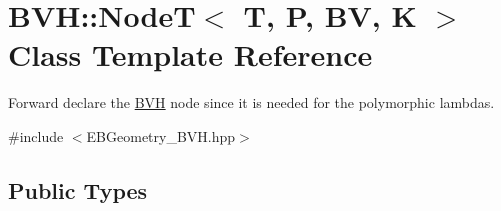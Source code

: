 \hypertarget{classBVH_1_1NodeT}{}\section{B\+VH\+:\+:NodeT$<$ T, P, BV, K $>$ Class Template Reference}
\label{classBVH_1_1NodeT}


Forward declare the \hyperlink{namespaceBVH}{B\+VH} node since it is needed for the polymorphic lambdas.  




{\ttfamily \#include $<$E\+B\+Geometry\+\_\+\+B\+V\+H.\+hpp$>$}

\subsection*{Public Types}
